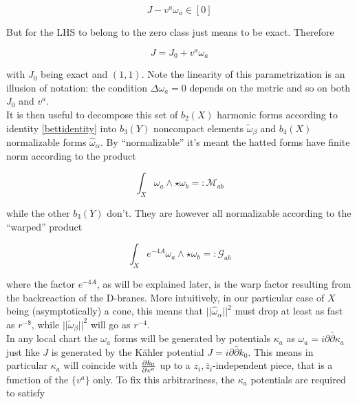 \begin{equation}
	J - v^a \omega_a \in [0]
\end{equation}

But for the LHS to belong to the zero class just means to be exact. Therefore

\begin{equation}
	J = J_0 + v^a \omega_a \label{JandJ0}
\end{equation}

with $J_0$ being exact and $(1,1)$. Note the linearity of this parametrization is an illusion of notation: the condition $\Delta \omega_a = 0$ depends on the metric and so on both $J_0$ and $v^a$.\\

It is then useful to decompose this set of $b_2(X)$ harmonic forms according to identity \ref{bettidentity} into $b_3(Y)$ noncompact elements $\tilde\omega_\beta$ and $b_4(X)$ normalizable forms $\hat\omega_\alpha$. By ``normalizable'' it's meant the hatted forms have finite norm according to the product

\begin{equation}
	\int_X \omega_a \wedge \star \omega_b =: \mathcal{M}_{ab}
\end{equation}

while the other $b_3(Y)$ don't. They are however all normalizable according to the ``warped'' product

\begin{equation}
	\int_X e^{-4A} \omega_a \wedge \star \omega_b =: \mathcal{G}_{ab}
	\label{}
\end{equation}

where the factor $e^{-4A}$, as will be explained later, is the warp factor resulting from the backreaction of the D-branes. More intuitively, in our particular case of $X$ being (asymptotically) a cone, this means that $||\hat\omega_\alpha||^2$ must drop at least as fast as $r^{-8}$, while $||\tilde\omega_\beta||^2$ will go as $r^{-4}$.\\

In any local chart the $\omega_a$ forms will be generated by potentials $\kappa_a$ as $\omega_a = i \partial \bar \partial \kappa_a$ just like $J$ is generated by the K\"ahler potential $J = i \partial \bar \partial k_0$. This means in particular $\kappa_a$ will coincide with $\frac{\partial k_0}{\partial v^a}$ up to a $z_i, \bar z_i$-independent piece, that is a function of the $\{v^a\}$ only. To fix this arbitrariness, the $\kappa_a$ potentials are required to satisfy

